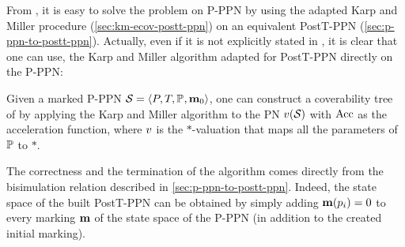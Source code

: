 From \cite{David17}, it is easy to solve the \Ecov problem on P-PPN by using the adapted Karp and Miller procedure (\cref{sec:km-ecov-postt-ppn}) on an equivalent PostT-PPN (\cref{sec:p-ppn-to-postt-ppn}).
Actually, even if it is not explicitly stated in \cite{David17}, it is clear that one can use,
the Karp and Miller algorithm adapted for PostT-PPN directly on the P-\ac{PPN}:

Given a marked P-PPN $\defPPN$, one can construct a coverability tree \nameT of \namePPN by applying the Karp and Miller algorithm to the PN $\val[\namePPN]$ with $\operatorname{Acc}$ as the acceleration function, where $\val$ is the $*$-valuation that maps all the parameters of $\mathbb{P}$ to $*$.

The correctness and the termination of the algorithm comes directly from the bisimulation relation described in \cref{sec:p-ppn-to-postt-ppn}.
Indeed, the state space of the built PostT-PPN can be obtained by simply adding $\mathbf{m}(p_i) = 0$ to every marking $\mathbf{m}$ of the state space of the P-PPN (in addition to the created initial marking).



